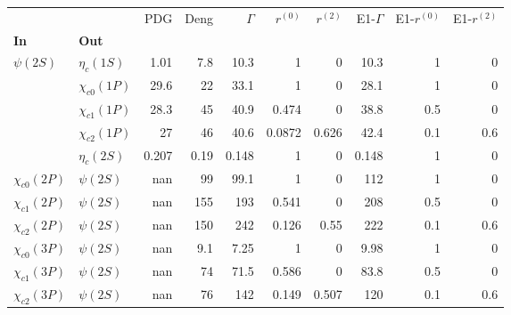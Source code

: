 \begin{tabular}{l|l|r|r|r|r|r|r|r|r}
\toprule
                &            &   PDG &  Deng &  $\Gamma$ &  $r^{(0)}$ &  $r^{(2)}$ &  E1-$\Gamma$ &  E1-$r^{(0)}$ &  E1-$r^{(2)}$ \\
\textbf{In} & \textbf{Out} &       &       &           &            &            &              &               &               \\
\midrule
\textbf{$\psi(2S)$} & \textbf{$\eta_{c}(1S)$} &  1.01 &   7.8 &      10.3 &          1 &          0 &         10.3 &             1 &             0 \\
                & \textbf{$\chi_{c0}(1P)$} &  29.6 &    22 &      33.1 &          1 &          0 &         28.1 &             1 &             0 \\
                & \textbf{$\chi_{c1}(1P)$} &  28.3 &    45 &      40.9 &      0.474 &          0 &         38.8 &           0.5 &             0 \\
                & \textbf{$\chi_{c2}(1P)$} &    27 &    46 &      40.6 &     0.0872 &      0.626 &         42.4 &           0.1 &           0.6 \\
                & \textbf{$\eta_{c}(2S)$} & 0.207 &  0.19 &     0.148 &          1 &          0 &        0.148 &             1 &             0 \\
\textbf{$\chi_{c0}(2P)$} & \textbf{$\psi(2S)$} &   nan &    99 &      99.1 &          1 &          0 &          112 &             1 &             0 \\
\textbf{$\chi_{c1}(2P)$} & \textbf{$\psi(2S)$} &   nan &   155 &       193 &      0.541 &          0 &          208 &           0.5 &             0 \\
\textbf{$\chi_{c2}(2P)$} & \textbf{$\psi(2S)$} &   nan &   150 &       242 &      0.126 &       0.55 &          222 &           0.1 &           0.6 \\
\textbf{$\chi_{c0}(3P)$} & \textbf{$\psi(2S)$} &   nan &   9.1 &      7.25 &          1 &          0 &         9.98 &             1 &             0 \\
\textbf{$\chi_{c1}(3P)$} & \textbf{$\psi(2S)$} &   nan &    74 &      71.5 &      0.586 &          0 &         83.8 &           0.5 &             0 \\
\textbf{$\chi_{c2}(3P)$} & \textbf{$\psi(2S)$} &   nan &    76 &       142 &      0.149 &      0.507 &          120 &           0.1 &           0.6 \\
\bottomrule
\end{tabular}
